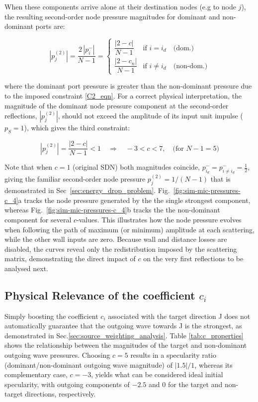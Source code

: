 \documentclass[journal]{IEEEtran}
\begin{document}
When these components arrive alone at their destination nodes (e.g to node $j$), the resulting second-order node pressure magnitudes for dominant and non-dominant ports are:

\begin{equation}
|p_j^{(2)}| = \frac{2\,|p^-_{i}|}{N - 1} =
\begin{cases}
\dfrac{|2 - c|}{N - 1} & \text{if } i = i_d \quad \text{(dom.)} \\
\dfrac{|2 - c_n|}{N - 1}   & \text{if } i \neq i_d \quad \text{(non-dom.)}
\end{cases}
\end{equation}


where the dominant port pressure is greater than the non-dominant pressure due to the imposed constraint \eqref{C2_eqn}.
For a correct physical interpretation, the magnitude of the dominant node pressure component at the second-order reflections, $|p^{(2)}_j|$, should not exceed the amplitude of its input unit impulse (\(p_S=1\)), which gives the third constraint:

\begin{equation}
\label{constraint3}
|p^{(2)}_j| = \frac{\lvert 2-c\rvert}{N-1} < 1
\quad\Longrightarrow\quad
        -3 < c < 7,  \quad \text{(for } N - 1 = 5\text{)}
\end{equation}

Note that when $c=1$ (original SDN) both magnitudes coincide,
$p^-_{i_d}=p^-_{i\neq i_d}=\tfrac12$, giving the familiar
second-order node pressure $p^{(2)}_j={1}/{(N-1)}$ that is demonstrated in Sec~\ref{sec:energy_drop_problem}. Fig.~\ref{fig:sim-mic-pressures-c_4}a tracks the node pressure generated by the the single strongest component, whereas Fig.~\ref{fig:sim-mic-pressures-c_4}b tracks the the non-dominant component for several \( c\)-values. This illustrates how the node pressure evolves when following the path of maximum (or minimum) amplitude at each scattering, while the other wall inputs are zero. Because wall and distance losses are disabled, the curves reveal only the redistribution imposed by the scattering matrix, demonstrating the direct impact of \( c \) on the very first reflections to be analysed next.

\subsection{Physical Relevance of the coefficient $c_i$}
\label{sec:physical_relevance}

Simply boosting the coefficient \(c_i\) associated with the target direction J does not automatically guarantee that the outgoing wave towards J is the strongest, as demonstrated in Sec.\ref{sec:source_weighting_analysis}. 
Table \ref{tab:c_properties} shows the relationship between the magnitudes of the target and non-dominant outgoing wave pressures. Choosing $c=5$ results in a specularity ratio (dominant/non-dominant outgoing wave magnitude) of $|1.5|/1$, whereas its complementary case, $c=-3$, yields what can be considered ideal initial specularity, with outgoing components of $-2.5$ and $0$ for the target and non-target directions, respectively.
\end{document}
